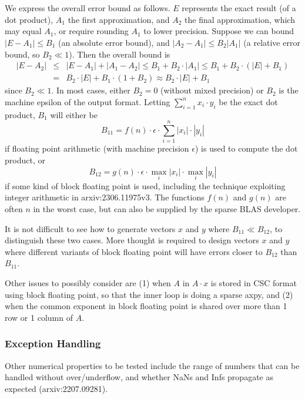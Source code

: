 \documentclass{article}
\begin{document}
We express the overall error bound as follows. $E$ represents the exact result
(of a dot product), $A_1$ the first approximation, and $A_2$ the final approximation,
which may equal $A_1$, or require rounding $A_1$ to lower precision.
Suppose we can bound $|E - A_1| \leq B_1$ (an absolute error bound),
and $|A_2 - A_1| \leq B_2 \dot |A_1|$ (a relative error bound, so $B_2 \ll 1$). 
Then the overall bound is
\begin{eqnarray*}
|E - A_2| & \leq & |E - A_1| + |A_1 - A_2| 
            \leq B_1 + B_2 \cdot |A_1|
            \leq B_1 + B_2 \cdot (|E| + B_1) \\
        & = & B_2 \cdot |E| + B_1 \cdot (1+B_2)
            \approx  B_2 \cdot |E| + B_1
\end{eqnarray*}
since $B_2 \ll 1$.
In most cases, either $B_2 = 0$ (without mixed precision) or $B_2$ is the
machine epsilon of the output format. Letting $\sum_{i=1}^n x_i \cdot y_i$
be the exact dot product, $B_1$ will either be
\[
   B_{11} = f(n) \cdot \epsilon \cdot \sum_{i=1}^n | x_i |  \cdot  | y_i |
\]
if floating point arithmetic (with machine precision $\epsilon$) is used 
to compute the dot product, or
\[
   B_{12} = g(n) \cdot \epsilon \cdot \max_i | x_i |  \cdot  \max_i | y_i |
\]
if some kind of block floating point is used, including the technique
exploiting integer arithmetic in arxiv:2306.11975v3.
The functions $f(n)$ and $g(n)$ are often $n$ in the
worst case, but can also be supplied by the sparse BLAS
developer.

It is not difficult  to see how to generate vectors $x$ and $y$ where $B_{11} \ll  B_{12}$,
to distinguish these two cases. More thought is required to design
vectors $x$ and $y$ where different variants of block floating point will have
errors closer to $B_{12}$ than $B_{11}$.

Other issues to possibly consider are (1) when $A$ in $A \cdot x$ is stored
in CSC format using block floating point, so that the inner loop is doing a
sparse axpy, and (2) when the common exponent in block floating point is
shared over more than 1 row or 1 column of $A$.

\subsubsection{Exception Handling}

Other numerical properties to be tested include the range of numbers
that can be handled without over/underflow, and whether NaNs and
Infs propagate as expected (arxiv:2207.09281).
\end{document}
